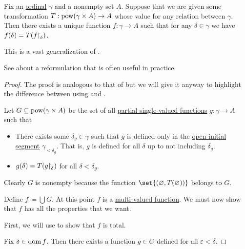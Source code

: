 \begin{theorem}\label{thm:bounded_transfinite_recursion}
  Fix an \hyperref[def:ordinal]{ordinal} \( \gamma \) and a nonempty set \( A \). Suppose that we are given some transformation \( T: \operatorname{pow}(\gamma \times A) \to A \) whose value for any relation between \( \gamma \). Then there exists a unique function \( f: \gamma \to A \) such that for any \( \delta \in \gamma \) we have \( f(\delta) = T(f{\upharpoonright}_\delta) \).

  This is a vast generalization of .

  See  about a reformulation that is often useful in practice.
\end{theorem}
\begin{proof}
  The proof is analogous to that of  but we will give it anyway to highlight the difference between using  and .

  Let \( G \subseteq \operatorname{pow}(\gamma \times A) \) be the set of all \hyperref[def:partial_function]{partial single-valued functions} \( g: \gamma \to A \) such that
  \begin{itemize}
    \item There exists some \( \delta_g \in \gamma \) such that \( g \) is defined only in the \hyperref[def:poset_interval/ray]{open initial segment} \( \gamma_{< \delta_g} \). That is, \( g \) is defined for all \( \delta \) up to not including \( \delta_g \).

    \item \( g(\delta) = T(g{\upharpoonright}_\delta) \) for all \( \delta < \delta_g \).
  \end{itemize}

  Clearly \( G \) is nonempty because the function \( \set{ (\varnothing, T(\varnothing)) } \) belongs to \( G \).

  Define \( f \coloneqq \bigcup G \). At this point \( f \) is a \hyperref[def:multi_valued_function]{multi-valued function}. We must now show that \( f \) has all the properties that we want.

   First, we will use  to show that \( f \) is total.

  Fix \( \delta \in \operatorname{dom} f \). Then there exists a function \( g \in G \) defined for all \( \varepsilon < \delta \).


\end{proof}
